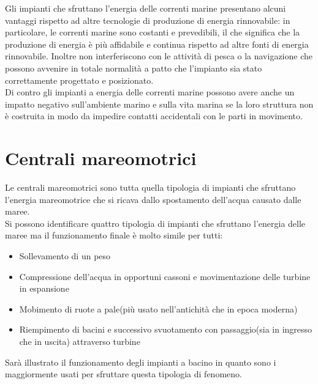 Gli impianti che sfruttano l'energia delle correnti marine presentano alcuni vantaggi rispetto ad altre tecnologie di produzione di energia rinnovabile: in particolare, le correnti marine sono costanti e prevedibili, il che significa che la produzione di energia è più affidabile e continua rispetto ad altre fonti di energia rinnovabile.
Inoltre non interferiscono con le attività di pesca o la navigazione che possono avvenire in totale normalità a patto che l'impianto sia stato correttamente progettato e posizionato.\\
Di contro gli impianti a energia delle correnti marine possono avere anche un impatto negativo sull'ambiente marino e sulla vita marina se la loro struttura non è costruita in modo da impedire contatti accidentali con le parti in movimento.\\
\section{Centrali mareomotrici}
Le centrali mareomotrici sono tutta quella tipologia di impianti che sfruttano l'energia mareomotrice che si ricava dallo spostamento dell'acqua causato dalle maree.\\
Si possono identificare quattro tipologia di impianti che sfruttano l'energia delle maree ma il funzionamento finale è molto simile per tutti:\\
\begin{itemize}
    \item Sollevamento di un peso
    \item Compressione dell'acqua in opportuni cassoni e movimentazione delle turbine in espansione
    \item Mobimento di ruote a pale(più usato nell'antichità che in epoca moderna)
    \item Riempimento di bacini e successivo svuotamento con passaggio(sia in ingresso che in uscita) attraverso turbine
\end{itemize}
Sarà illustrato il funzionamento degli impianti a bacino in quanto sono i maggiormente usati per sfruttare questa tipologia di fenomeno.\\
